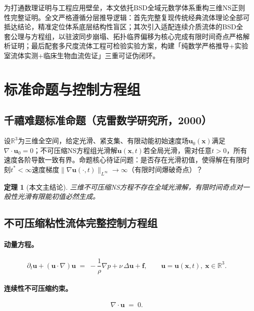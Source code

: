 \documentclass[11pt,a4paper]{ctexart}
\newtheorem{theorem}{定理}
\theoremstyle{remark}
\newcommand{\uvec}{\bm{u}}
\newcommand{\pvec}{\bm{f}}
\begin{document}
为打通数理证明与工程应用壁垒，本文依托BSD全域元数学体系重构三维NS正则性完整证明。全文严格遵循分层推导逻辑：首先完整复现传统经典流体理论全部可抵达结论，精准定位体系底层结构性盲区；其次引入适配连续介质流体的BSD全套公理与方程组，以驻波同步崩塌、拓扑临界偏移为核心完成有限时间奇点严格解析证明；最后配套多尺度流体工程可检验实验方案，构建「纯数学严格推导+实验室流体实测+临床生物血流佐证」三重可证伪闭环。

\section{标准命题与控制方程组}\label{sec:statement}

\subsection{千禧难题标准命题（克雷数学研究所，2000）}\label{sec:clay}

设$\mathbb{R}^{3}$为三维全空间，给定光滑、紧支集、有限动能初始速度场$\uvec_{0}(\bm{x})$满足$\nabla\!\cdot\!\uvec_{0}=0$；不可压缩NS方程组光滑解$\uvec(\bm{x},t)$若全局光滑，需对任意$t>0$，所有速度各阶导数一致有界。命题核心待证问题：是否存在光滑初值，使得解在有限时刻$t^{*}<\infty$速度梯度$\|\nabla\uvec(\cdot,t)\|_{L^{\infty}}\to\infty$（有限时间爆破奇点）？

\begin{theorem}[本文主结论]\label{thm:main}
三维不可压缩NS方程不存在全域光滑解，有限时间奇点对一般性光滑有限能初值必然生成。
\end{theorem}

\subsection{不可压缩粘性流体完整控制方程组}\label{sec:governing}

\paragraph{动量方程。}
\begin{equation}\label{eq:ns-momentum}
\partial_{t}\uvec + (\uvec\!\cdot\!\nabla)\uvec \;=\; -\frac{1}{\rho}\nabla p + \nu\,\Delta\uvec + \pvec,
\qquad \uvec=\uvec(\bm{x},t),\ \bm{x}\in\mathbb{R}^{3}.
\end{equation}

\paragraph{连续性不可压缩约束。}
\begin{equation}\label{eq:ns-incomp}
\nabla\!\cdot\!\uvec \;=\; 0.
\end{equation}
\end{document}
